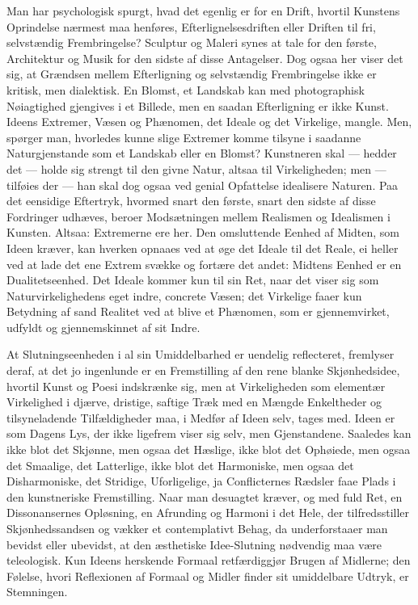 \documentclass[12pt]{book}
\newcommand{\apage}[1]{\marginnote{\footnotesize\textit{[#1]}}}
\begin{document}
Man har psychologisk spurgt, hvad det egenlig er for en Drift, hvortil
Kunstens Oprindelse nærmest maa henføres, Efterlignelsesdriften eller Driften
til fri, \apage{253} selvstændig Frembringelse? Sculptur og Maleri synes at tale for den
første, Architektur og Musik for den sidste af disse Antagelser. Dog ogsaa her
viser det sig, at Grændsen mellem Efterligning og selvstændig Frembringelse
ikke er kritisk, men dialektisk. En Blomst, et Landskab kan med photographisk
Nøiagtighed gjengives i et Billede, men en saadan Efterligning er ikke Kunst.
Ideens Extremer, Væsen og Phænomen, det Ideale og det Virkelige, mangle. Men,
spørger man, hvorledes kunne slige Extremer komme tilsyne i saadanne
Naturgjenstande som et Landskab eller en Blomst? Kunstneren skal --- hedder det --- holde sig strengt til den givne Natur, altsaa til Virkeligheden; men ---
tilføies der --- han skal dog ogsaa ved genial Opfattelse idealisere Naturen.
Paa det eensidige Eftertryk, hvormed snart den første, snart den sidste af
disse Fordringer udhæves, beroer Modsætningen mellem Realismen og Idealismen i
Kunsten. Altsaa: Extremerne ere her. Den omsluttende Eenhed af Midten, som
Ideen kræver, kan hverken opnaaes ved at øge det Ideale til det Reale, ei
heller ved at lade det ene Extrem svække og fortære det andet: Midtens Eenhed
er en Dualitetseenhed. Det Ideale kommer kun til sin Ret, naar det viser sig
som Naturvirkelighedens eget indre, concrete Væsen; det Virkelige faaer kun
Betydning af sand Realitet ved at blive et Phænomen, som er gjennemvirket,
udfyldt og gjennemskinnet af sit Indre.

At Slutningseenheden i al sin Umiddelbarhed er uendelig reflecteret, fremlyser
deraf, at det jo  \apage{254} ingenlunde er en Fremstilling af den rene blanke
Skjønhedsidee, hvortil Kunst og Poesi indskrænke sig, men at Virkeligheden som
elementær Virkelighed i djærve, dristige, saftige Træk med en Mængde
Enkeltheder og tilsyneladende Tilfældigheder maa, i Medfør af Ideen selv,
tages med. Ideen er som Dagens Lys, der ikke ligefrem viser sig selv, men
Gjenstandene. Saaledes kan ikke blot det Skjønne, men ogsaa det Hæslige, ikke
blot det Ophøiede, men ogsaa det Smaalige, det Latterlige, ikke blot det
Harmoniske, men ogsaa det Disharmoniske, det Stridige, Uforligelige, ja
Conflicternes Rædsler faae Plads i den kunstneriske Fremstilling. Naar man
desuagtet kræver, og med fuld Ret, en Dissonansernes Opløsning, en Afrunding
og Harmoni i det Hele, der tilfredsstiller Skjønhedssandsen og vækker et
contemplativt Behag, da underforstaaer man bevidst eller ubevidst, at den
æsthetiske Idee-Slutning nødvendig maa være teleologisk. Kun Ideens herskende
Formaal retfærdiggjør Brugen af Midlerne; den Følelse, hvori Reflexionen af
Formaal og Midler finder sit umiddelbare Udtryk, er Stemningen.
\end{document}
